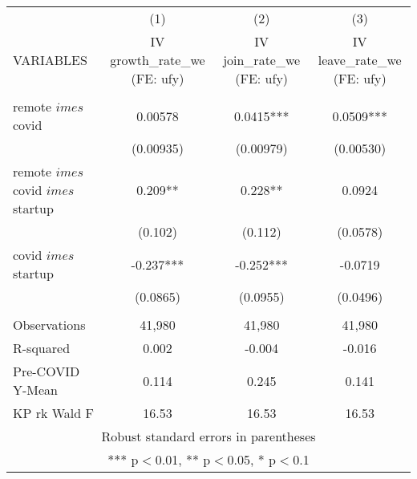 \documentclass[]{article}
\begin{document}
\begin{tabular}{lccc} \hline
 & (1) & (2) & (3) \\
VARIABLES & IV growth\_rate\_we (FE: ufy) & IV join\_rate\_we (FE: ufy) & IV leave\_rate\_we (FE: ufy) \\ \hline
 &  &  &  \\
remote $	imes$ covid & 0.00578 & 0.0415*** & 0.0509*** \\
 & (0.00935) & (0.00979) & (0.00530) \\
remote $	imes$ covid $	imes$ startup & 0.209** & 0.228** & 0.0924 \\
 & (0.102) & (0.112) & (0.0578) \\
covid $	imes$ startup & -0.237*** & -0.252*** & -0.0719 \\
 & (0.0865) & (0.0955) & (0.0496) \\
 &  &  &  \\
Observations & 41,980 & 41,980 & 41,980 \\
R-squared & 0.002 & -0.004 & -0.016 \\
Pre-COVID Y-Mean & 0.114 & 0.245 & 0.141 \\
 KP rk Wald F & 16.53 & 16.53 & 16.53 \\ \hline
\multicolumn{4}{c}{ Robust standard errors in parentheses} \\
\multicolumn{4}{c}{ *** p$<$0.01, ** p$<$0.05, * p$<$0.1} \\
\end{tabular}
\end{document}

